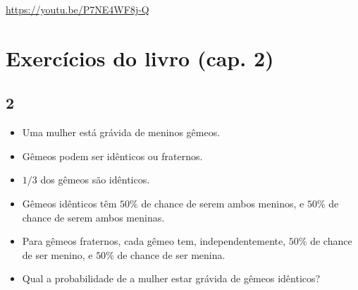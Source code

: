 \documentclass[
  11pt]{report}
\begin{document}
\begin{center} \url{https://youtu.be/P7NE4WF8j-Q} \end{center}

\hypertarget{exercuxedcios-do-livro-cap.-2}{%
\section*{Exercícios do livro (cap. 2)}\label{exercuxedcios-do-livro-cap.-2}}

\hypertarget{section-8}{%
\subsection*{2}\label{section-8}}

\begin{rmdbox}

\begin{itemize}
\item
  Uma mulher está grávida de meninos gêmeos.
\item
  Gêmeos podem ser idênticos ou fraternos.
\item
  $1/3$ dos gêmeos são idênticos.
\item
  Gêmeos idênticos têm $50\%$ de chance de serem ambos meninos, e $50\%$ de chance de serem ambos meninas.
\item
  Para gêmeos fraternos, cada gêmeo tem, independentemente, $50\%$ de chance de ser menino, e $50\%$ de chance de ser menina.
\item
  Qual a probabilidade de a mulher estar grávida de gêmeos idênticos?
\end{itemize}

\end{rmdbox}
\end{document}
